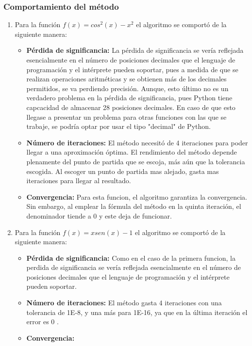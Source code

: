 \documentclass{article}
\begin{document}
\subsubsection{Comportamiento del método}
\begin{enumerate}
    \item Para la función \(f(x) = cos^2(x)-x^2\) el algoritmo se comportó de la siguiente manera:
    \begin{itemize}
        \item \textbf{Pérdida de significancia:}
        La pérdida de significancia se vería reflejada esencialmente en el número de posiciones decimales que el lenguaje de programación y el intérprete pueden soportar, pues a medida de que se realizan operaciones aritméticas y se obtienen más de los decimales permitidos, se va perdiendo precisión. Aunque, esto último no es un verdadero problema en la pérdida de significancia, pues Python tiene capcacidad de almacenar 28 posiciones decimales. En caso de que esto llegase a presentar un problema para otras funciones con las que se trabaje, se podría optar por usar el tipo "decimal" de Python.
        \item \textbf{Número de iteraciones:}
        El método necesitó de 4 iteraciones  para poder llegar a una aproximación óptima.  El rendimiento del método depende  plenamente del punto de partida que se escoja, más aún que la tolerancia escogida.  Al escoger un punto de partida mas alejado, gasta mas iteraciones para llegar al resultado. 
        \item \textbf{Convergencia:}
        Para  esta  funcion, el algoritmo garantiza la  convergencia. Sin embargo, al emplear la fórmula del método en la quinta iteración, el denominador tiende a 0 y este deja de funcionar.
    \end{itemize}
    \item Para la función \(f(x) = xsen(x)-1\) el algoritmo se comportó de la siguiente manera:
    \begin{itemize}
        \item \textbf{Pérdida de significancia:}
        Como en el caso de la primera funcion, la perdida  de significancia se vería reflejada esencialmente  en el número de posiciones decimales  que el lenguaje  de programación y el intérprete  pueden  soportar.
        \item \textbf{Número de iteraciones:}
        El método gasta 4 iteraciones con una tolerancia de 1E-8, y una más para 1E-16, ya que en la última iteración el error es 0 .
        \item \textbf{Convergencia:}

\end{itemize}
\end{enumerate}
\end{document}
